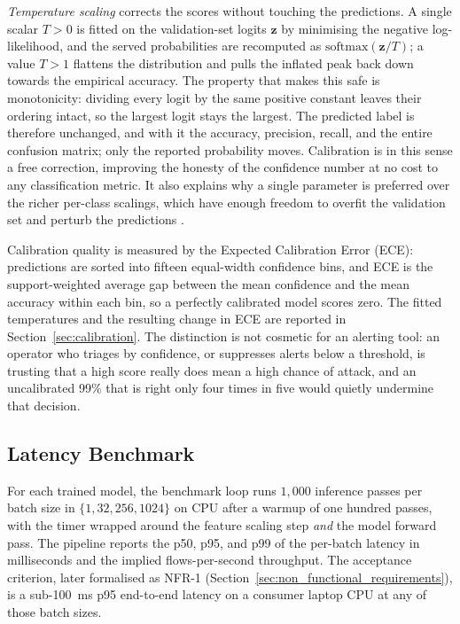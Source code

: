 \par \emph{Temperature scaling} corrects the scores without touching the predictions. A single scalar $T > 0$ is fitted on the validation-set logits $\mathbf{z}$ by minimising the negative log-likelihood, and the served probabilities are recomputed as $\mathrm{softmax}(\mathbf{z}/T)$; a value $T > 1$ flattens the distribution and pulls the inflated peak back down towards the empirical accuracy. The property that makes this safe is monotonicity: dividing every logit by the same positive constant leaves their ordering intact, so the largest logit stays the largest. The predicted label is therefore unchanged, and with it the accuracy, precision, recall, and the entire confusion matrix; only the reported probability moves. Calibration is in this sense a free correction, improving the honesty of the confidence number at no cost to any classification metric. It also explains why a single parameter is preferred over the richer per-class scalings, which have enough freedom to overfit the validation set and perturb the predictions \cite{Guo2017}.

\par Calibration quality is measured by the Expected Calibration Error (ECE): predictions are sorted into fifteen equal-width confidence bins, and ECE is the support-weighted average gap between the mean confidence and the mean accuracy within each bin, so a perfectly calibrated model scores zero. The fitted temperatures and the resulting change in ECE are reported in Section~\ref{sec:calibration}. The distinction is not cosmetic for an alerting tool: an operator who triages by confidence, or suppresses alerts below a threshold, is trusting that a high score really does mean a high chance of attack, and an uncalibrated 99\% that is right only four times in five would quietly undermine that decision.

\subsection{Latency Benchmark}
\label{subsec:latency_benchmark}

\par For each trained model, the benchmark loop runs $1{,}000$ inference passes per batch size in $\{1, 32, 256, 1024\}$ on CPU after a warmup of one hundred passes, with the timer wrapped around the feature scaling step \emph{and} the model forward pass. The pipeline reports the p50, p95, and p99 of the per-batch latency in milliseconds and the implied flows-per-second throughput. The acceptance criterion, later formalised as NFR-1 (Section~\ref{sec:non_functional_requirements}), is a sub-100~ms p95 end-to-end latency on a consumer laptop CPU at any of those batch sizes.
